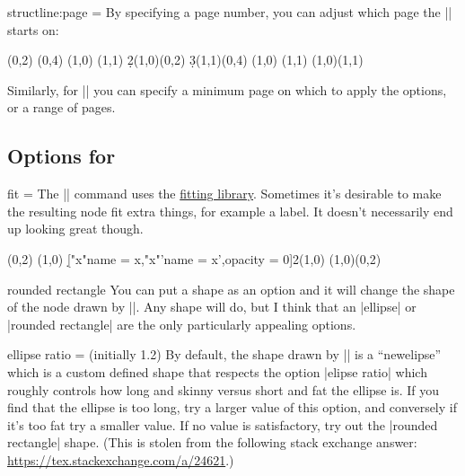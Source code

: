 \begin{sseqdata}[|| name = ex1, cohomological Serre grading]
\begin{key}{structline:page = }
By specifying a page number, you can adjust which page the |\structline| starts on:

\begin{codeexample}[]
\begin{sseqdata}[ name = structpage example2, title = \page, yscale = 0.5 ]
\class(0,2)
\class(0,4)
\class(1,0)
\class(1,1)
\d2(1,0)(0,2)
\d3(1,1)(0,4)
\replaceclass(1,0)
\replaceclass(1,1)
\structline[structline:page = 2](1,0)(1,1)
\end{sseqdata}
\printpage[name = structpage example2,page = 1]
\qquad
\printpage[name = structpage example2,page = 2]
\qquad
\printpage[name = structpage example2,page = 3]
\qquad
\printpage[name = structpage example2,page = 4]
\end{codeexample}

Similarly, for |\structlineoptions| you can specify a minimum page on which to apply the options, or a range of pages.
\end{key}

\subsection{Options for \sectionstring\circleclass}
\begin{key}{fit = }
The |\circleclasses| command uses the \href{\pgfmanualurl#section.52}{\tikzpkg\space fitting library}. Sometimes it's desirable to make the resulting node fit extra things, for example a label. It doesn't necessarily end up looking great though.
\begin{codeexample}[]
\begin{sseqpage}[Adams grading,axes gap = 0.7cm]
\class(0,2)
\class(1,0)
\d["x"{name = x},"x"'{name = x',opacity = 0}]2(1,0)
\circleclasses[fit = (x)(x'),rounded rectangle](1,0)(0,2)
\end{sseqpage}
\end{codeexample}
\end{key}

\begin{key}{rounded rectangle}
You can put a shape as an option and it will change the shape of the node drawn by |\circleclasses|. Any shape will do, but I think that an |ellipse| or |rounded rectangle| are the only particularly appealing options.
\end{key}

\begin{key}{ellipse ratio =  (initially 1.2)}
By default, the shape drawn by |\circleclasses| is a ``newelipse'' which is a custom defined shape that respects the option |elipse ratio| which roughly controls how long and skinny versus short and fat the ellipse is. If you find that the ellipse is too long, try a larger value of this option, and conversely if it's too fat try a smaller value. If no value is satisfactory, try out the |rounded rectangle| shape. (This is stolen from the following stack exchange answer: \url{https://tex.stackexchange.com/a/24621}.)
\end{key}


\end{sseqdata}
